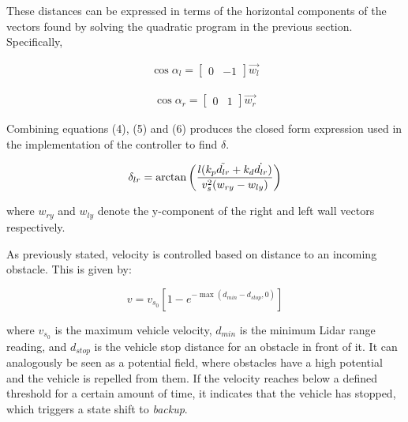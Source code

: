\documentclass[conference]{IEEEtran}
\begin{document}
These distances can be expressed in terms of the horizontal components of the vectors found by solving the quadratic program in the previous section. Specifically, 


\begin{equation}
    \begin{aligned}
        \cos \alpha_l = \begin{bmatrix}
            0 & -1
        \end{bmatrix} \Vec{w_l} 
    \end{aligned}
\end{equation}

\begin{equation}
    \begin{aligned}
         \cos \alpha_r = \begin{bmatrix}
            0 & 1
        \end{bmatrix} \Vec{w_r}
    \end{aligned}
\end{equation}


Combining equations (4), (5) and (6) produces the closed form expression used in the implementation of the controller to find $\delta$.

\begin{equation}
    \begin{aligned}
        \delta_{lr} = \arctan \left( \frac{l(k_p \Tilde{d_{lr}}+ k_d \dot{d_{lr}})}{v_s^2(w_{ry} - w_{ly})} \right)
    \end{aligned}
\end{equation}

where $w_{ry}$ and $w_{ly}$ denote the y-component of the right and left wall vectors respectively.  



As previously stated, velocity is controlled based on distance to an incoming obstacle. This is given by:

\begin{equation}
    v = v_{s_0}\left[1-e^{-\max(d_{min}-d_{stop},0)}\right]
\end{equation}

where $v_{s_0}$ is the maximum vehicle velocity, $d_{min}$ is the minimum Lidar range reading, and $d_{stop}$ is the vehicle stop distance for an obstacle in front of it. It can analogously be seen as a potential field, where obstacles have a high potential and  the vehicle is repelled from them. If the velocity reaches below a defined threshold for a certain amount of time, it indicates that the vehicle has stopped, which triggers a state shift to \textit{backup}. 
\end{document}
